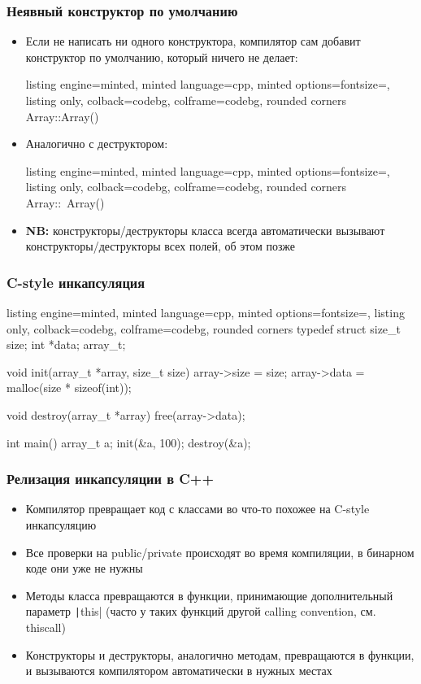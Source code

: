 \documentclass[10pt]{beamer}
\begin{document}
\begin{frame}[fragile]
\frametitle{Неявный конструктор по умолчанию}
\begin{itemize}
\item Если не написать ни одного конструктора, компилятор сам добавит конструктор по умолчанию, который ничего не делает:
\begin{tcblisting}{listing engine=minted, minted language=cpp, minted options={fontsize=\scriptsize}, listing only, colback=codebg, colframe=codebg, rounded corners}
Array::Array() {}
\end{tcblisting}
\pause
\item Аналогично с деструктором:
\begin{tcblisting}{listing engine=minted, minted language=cpp, minted options={fontsize=\scriptsize}, listing only, colback=codebg, colframe=codebg, rounded corners}
Array::~Array() {}
\end{tcblisting}
\pause
\item \textbf{NB:} конструкторы/деструкторы класса всегда автоматически вызывают конструкторы/деструкторы всех полей, об этом позже
\end{itemize}
\end{frame}

\begin{frame}[fragile]
\frametitle{C-style инкапсуляция}
\begin{tcblisting}{listing engine=minted, minted language=cpp, minted options={fontsize=\scriptsize}, listing only, colback=codebg, colframe=codebg, rounded corners}
typedef struct {
  size_t size;
  int *data;
} array_t;

void init(array_t *array, size_t size) {
  array->size = size;
  array->data = malloc(size * sizeof(int));
}

void destroy(array_t *array) {
  free(array->data);
}

int main() {
  array_t a;
  init(&a, 100);
  destroy(&a);
}
\end{tcblisting}
\end{frame}

\begin{frame}[fragile]
\frametitle{Релизация инкапсуляции в C++}
\begin{itemize}
\item Компилятор превращает код с классами во что-то похожее на C-style инкапсуляцию
\pause
\item Все проверки на public/private происходят во время компиляции, в бинарном коде они уже не нужны
\pause
\item Методы класса превращаются в функции, принимающие дополнительный параметр \texttt|this| (часто у таких функций другой calling convention, см. thiscall)
\pause
\item Конструкторы и деструкторы, аналогично методам, превращаются в функции, и вызываются компилятором автоматически в нужных местах
\end{itemize}
\end{frame}
\end{document}
